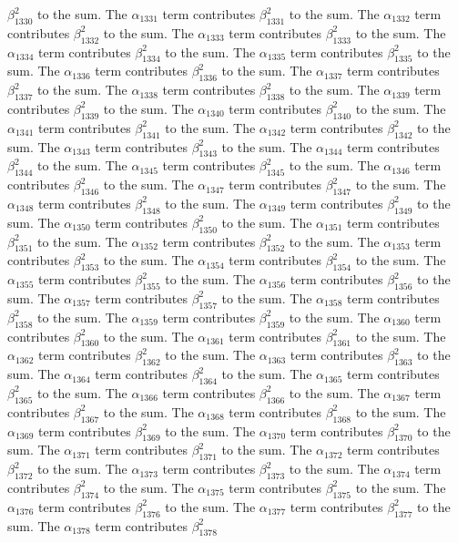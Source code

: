 \begin{lemma}
$\beta_{1330}^{2}$ to the sum. The $\alpha_{1331}$ term contributes $\beta_{1331}^{2}$ to the sum. The $\alpha_{1332}$ term contributes $\beta_{1332}^{2}$ to the sum. The $\alpha_{1333}$ term contributes $\beta_{1333}^{2}$ to the sum. The $\alpha_{1334}$ term contributes $\beta_{1334}^{2}$ to the sum. The $\alpha_{1335}$ term contributes $\beta_{1335}^{2}$ to the sum. The $\alpha_{1336}$ term contributes $\beta_{1336}^{2}$ to the sum. The $\alpha_{1337}$ term contributes $\beta_{1337}^{2}$ to the sum. The $\alpha_{1338}$ term contributes $\beta_{1338}^{2}$ to the sum. The $\alpha_{1339}$ term contributes $\beta_{1339}^{2}$ to the sum. The $\alpha_{1340}$ term contributes $\beta_{1340}^{2}$ to the sum. The $\alpha_{1341}$ term contributes $\beta_{1341}^{2}$ to the sum. The $\alpha_{1342}$ term contributes $\beta_{1342}^{2}$ to the sum. The $\alpha_{1343}$ term contributes $\beta_{1343}^{2}$ to the sum. The $\alpha_{1344}$ term contributes $\beta_{1344}^{2}$ to the sum. The $\alpha_{1345}$ term contributes $\beta_{1345}^{2}$ to the sum. The $\alpha_{1346}$ term contributes $\beta_{1346}^{2}$ to the sum. The $\alpha_{1347}$ term contributes $\beta_{1347}^{2}$ to the sum. The $\alpha_{1348}$ term contributes $\beta_{1348}^{2}$ to the sum. The $\alpha_{1349}$ term contributes $\beta_{1349}^{2}$ to the sum. The $\alpha_{1350}$ term contributes $\beta_{1350}^{2}$ to the sum. The $\alpha_{1351}$ term contributes $\beta_{1351}^{2}$ to the sum. The $\alpha_{1352}$ term contributes $\beta_{1352}^{2}$ to the sum. The $\alpha_{1353}$ term contributes $\beta_{1353}^{2}$ to the sum. The $\alpha_{1354}$ term contributes $\beta_{1354}^{2}$ to the sum. The $\alpha_{1355}$ term contributes $\beta_{1355}^{2}$ to the sum. The $\alpha_{1356}$ term contributes $\beta_{1356}^{2}$ to the sum. The $\alpha_{1357}$ term contributes $\beta_{1357}^{2}$ to the sum. The $\alpha_{1358}$ term contributes $\beta_{1358}^{2}$ to the sum. The $\alpha_{1359}$ term contributes $\beta_{1359}^{2}$ to the sum. The $\alpha_{1360}$ term contributes $\beta_{1360}^{2}$ to the sum. The $\alpha_{1361}$ term contributes $\beta_{1361}^{2}$ to the sum. The $\alpha_{1362}$ term contributes $\beta_{1362}^{2}$ to the sum. The $\alpha_{1363}$ term contributes $\beta_{1363}^{2}$ to the sum. The $\alpha_{1364}$ term contributes $\beta_{1364}^{2}$ to the sum. The $\alpha_{1365}$ term contributes $\beta_{1365}^{2}$ to the sum. The $\alpha_{1366}$ term contributes $\beta_{1366}^{2}$ to the sum. The $\alpha_{1367}$ term contributes $\beta_{1367}^{2}$ to the sum. The $\alpha_{1368}$ term contributes $\beta_{1368}^{2}$ to the sum. The $\alpha_{1369}$ term contributes $\beta_{1369}^{2}$ to the sum. The $\alpha_{1370}$ term contributes $\beta_{1370}^{2}$ to the sum. The $\alpha_{1371}$ term contributes $\beta_{1371}^{2}$ to the sum. The $\alpha_{1372}$ term contributes $\beta_{1372}^{2}$ to the sum. The $\alpha_{1373}$ term contributes $\beta_{1373}^{2}$ to the sum. The $\alpha_{1374}$ term contributes $\beta_{1374}^{2}$ to the sum. The $\alpha_{1375}$ term contributes $\beta_{1375}^{2}$ to the sum. The $\alpha_{1376}$ term contributes $\beta_{1376}^{2}$ to the sum. The $\alpha_{1377}$ term contributes $\beta_{1377}^{2}$ to the sum. The $\alpha_{1378}$ term contributes $\beta_{1378}^{2}$ 
\end{lemma}
